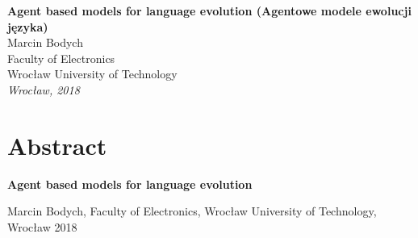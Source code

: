 \begin{titlepage}
   \centering
   \begin{figure}
      \centering
   \end{figure}
   {\LARGE{\textbf{Agent based models for language evolution (Agentowe modele ewolucji języka)}}}\\ 
    \vspace{2cm}
   {\Large{Marcin Bodych}}\\
   {\Large{Faculty of Electronics}}\\
   {\Large{Wrocław University of Technology}}\\
   \vspace{2cm}   
   {\Large{\textit{Wrocław, 2018}}}
\end{titlepage}

\newpage
\chapter*{Abstract} %
\thispagestyle{plain}
 \setcounter{page}{1}

\begin{center}
{{\bf Agent based models for language evolution}} \\
%
\end{center}
\begin{center}

{Marcin Bodych, Faculty of Electronics, Wrocław University of Technology, Wrocław 2018}\\
\end{center}



